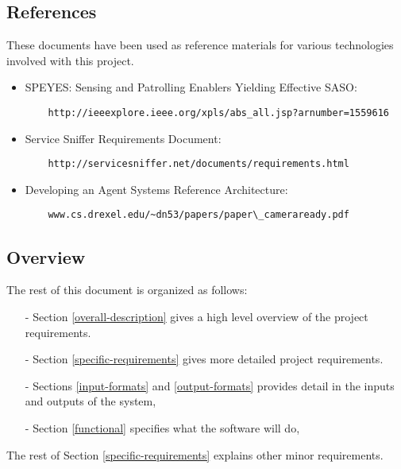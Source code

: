 \documentclass[titlepage]{article}
\begin{document}

\subsection{References%
  \label{references}%
}

These documents have been used as reference materials for various technologies involved with this project.
%
\begin{itemize}
	\item SPEYES: Sensing and Patrolling Enablers Yielding Effective SASO: 
	\begin{verbatim}
	http://ieeexplore.ieee.org/xpls/abs_all.jsp?arnumber=1559616
	\end{verbatim}
	\item Service Sniffer Requirements Document:
	\begin{verbatim}
	http://servicesniffer.net/documents/requirements.html
	\end{verbatim}
    	\item Developing an Agent Systems Reference Architecture: 
	\begin{verbatim}
	www.cs.drexel.edu/~dn53/papers/paper\_cameraready.pdf
	\end{verbatim}
\end{itemize}



\subsection{Overview%
  \label{overview}%
}

The rest of this document is organized as follows: 
\begin{itemize}
	\item[-]Section \ref{overall-description} gives a high level overview of the project requirements.  
	\item[-]Section \ref{specific-requirements} gives more detailed project requirements.  
	\item[-]Sections \ref{input-formats} and \ref{output-formats} provides detail in the inputs and outputs of the system, 
	\item[-]Section \ref{functional} specifies what the software will do, 
\end{itemize}
The rest of Section \ref{specific-requirements} explains other minor requirements.
\end{document}
